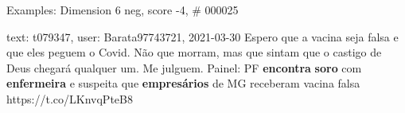 \begin{frame}{Examples: Dimension 6 neg, score -4, \# 000025}
\footnotesize
\begin{alertblock}{text: t079347, user: Barata97743721, 2021-03-30}
Espero que a vacina seja falsa e que eles peguem o Covid. Não que morram, mas 
que sintam que o castigo de Deus chegará qualquer um. Me julguem. Painel: PF 
\textbf{encontra} \textbf{soro} com \textbf{enfermeira} e suspeita que 
\textbf{empresários} de MG receberam vacina falsa https://t.co/LKnvqPteB8 
\end{alertblock}
\end{frame}
